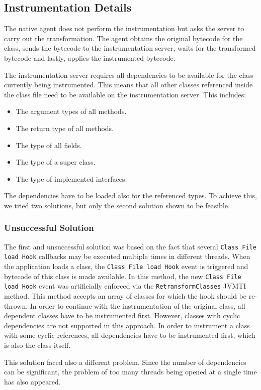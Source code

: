 \subsection{Instrumentation Details}
\label{imp:native:inst}
The native agent does not perform the instrumentation but asks the server to carry out the transformation. The agent obtains the original bytecode for the class, sends the bytecode to the instrumentation server, waits for the transformed bytecode and lastly, applies the instrumented bytecode.

The instrumentation server requires all dependencies to be available for the class currently being instrumented. This means that all other classes referenced inside the class file need to be available on the instrumentation server. This includes:
\begin{itemize}
	\item The argument types of all methods.
	\item The return type of all methods.
	\item The type of all fields.
	\item The type of a super class.
	\item The type of implemented interfaces.
\end{itemize}
The dependencies have to be loaded also for the referenced types. To achieve this, we tried two solutions, but only the second solution shown to be feasible.

\subsubsection{Unsuccessful Solution}
The first and unsuccessful solution was based on the fact that several \texttt{Class File load Hook} callbacks may be executed multiple times in different threads. When the application loads a class, the \texttt{Class File load Hook} event is triggered and bytecode of this class is made available. In this method, the new \texttt{Class File load Hook} event was artificially enforced via the \texttt{RetransformClasses} JVMTI method. This method accepts an array of classes for which the hook should be re-thrown. In order to continue with the instrumentation of the original class, all dependent classes have to be instrumented first. However, classes with cyclic dependencies are not supported in this approach. In order to instrument a class with some cyclic references, all dependencies have to be instrumented first, which is also the class itself.

This solution faced also a different problem. Since the number of dependencies can be significant, the problem of too many threads being opened at a single time has also appeared. 

